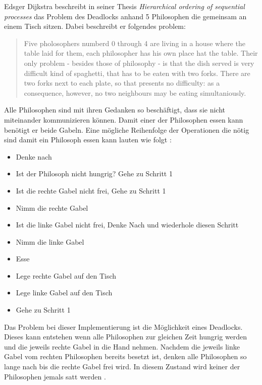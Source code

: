 Edsger Dijkstra beschreibt in seiner Thesis \emph{Hierarchical ordering of sequential processes} das Problem des Deadlocks anhand 5 Philosophen die gemeinsam an einem Tisch sitzen. Dabei beschreibt er folgendes problem:

\begin{quote}
	Five pholosophers numberd 0 through 4 are living in a house where the table laid for them, each philosopher has his own place hat the table. Their only problem - besides those of philosophy - is that the dish served is very difficult kind of spaghetti, that has to be eaten with two forks. There are two forks next to each plate, so that presents no difficulty: as a consequence, however, no two neighbours may be eating simultaniously. \cite[p. 21]{dij71}
\end{quote} 

Alle Philosophen sind mit ihren Gedanken so beschäftigt, dass sie nicht miteinander kommunizieren können. Damit einer der Philosophen essen kann benötigt er beide Gabeln. Eine mögliche Reihenfolge der Operationen die nötig sind damit ein Philosoph essen kann lauten wie folgt \cite[p. 21]{dij71}:

\begin{itemize}
  \item Denke nach
  \item Ist der Philosoph nicht hungrig? Gehe zu Schritt 1
  \item Ist die rechte Gabel nicht frei, Gehe zu Schritt 1
  \item Nimm die rechte Gabel
  \item Ist die linke Gabel nicht frei, Denke Nach und wiederhole diesen Schritt
  \item Nimm die linke Gabel
  \item Esse
  \item Lege rechte Gabel auf den Tisch  
  \item Lege linke Gabel auf den Tisch
  \item Gehe zu Schritt 1
\end{itemize}

Das Problem bei dieser Implementierung ist die Möglichkeit eines Deadlocks. Dieses kann entstehen wenn alle Philosophen zur gleichen Zeit hungrig werden und die jeweils rechte Gabel in die Hand nehmen. Nachdem die jeweils linke Gabel vom rechten Philosophen bereits besetzt ist, denken alle Philosophen so lange nach bis die rechte Gabel frei wird. In diesem Zustand wird keiner der Philosophen jemals satt werden \cite[p. 21]{dij71}. 


